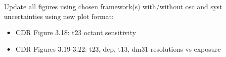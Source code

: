  Update all figures using chosen framework(s) with/without osc and syst uncertainties using new plot format:
\begin{itemize}
	\item CDR Figure 3.18: t23 octant sensitivity
	\item CDR Figures 3.19-3.22: t23, dcp, t13, dm31 resolutions vs exposure
\end{itemize}
